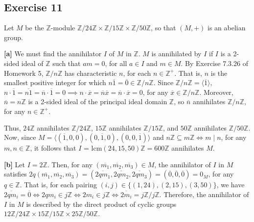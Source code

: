 \subsection*{Exercise 11}
Let $M$ be the $\mathbb{Z}$-module $\mathbb{Z}/24\mathbb{Z} \times \mathbb{Z}/15\mathbb{Z} \times \mathbb{Z}/50\mathbb{Z}$, so that $(M,+)$ is an abelian group.

\vspace{5 mm}
\textbf{[a]} We must find the annihilator $I$ of $M$ in $\mathbb{Z}$. $M$ is annihilated by $I$ if $I$ is a 2-sided ideal of $\mathbb{Z}$ such that $am = 0$, for all $a \in I$ and $m \in M$. By Exercise 7.3.26 of Homework 5, $\mathbb{Z}
/n\mathbb{Z}$ has characteristic $n$, for each $n \in \mathbb{Z}^+$. That is, $n$ is the smallest positive integer for which $n\overline{1} = \overline{0} \in \mathbb{Z}/n\mathbb{Z}$. Since $\mathbb{Z}/n\mathbb{Z} = \langle \overline{1} \rangle$, $n\cdot\overline{1} = \overline{n1} = \overline{n}\cdot\overline{1} = 0 \implies n\cdot\overline{x} = \overline{n}\overline{x} = \overline{n}\cdot\overline{x} = 0$, for any $\overline{x} \in \mathbb{Z}/n\mathbb{Z}$. Moreover, $\overline{n} = n\mathbb{Z}$ is a 2-sided ideal of the principal ideal domain $\mathbb{Z}$, so $\overline{n}$ annihilates $\mathbb{Z}/n\mathbb{Z}$, for any $n \in \mathbb{Z}^+$.

Thus, $24\mathbb{Z}$ annihilates $\mathbb{Z}/24\mathbb{Z}$, $15\mathbb{Z}$ annihilates $\mathbb{Z}/15\mathbb{Z}$, and $50\mathbb{Z}$ annihilates $\mathbb{Z}/50\mathbb{Z}$. Now, since $M = \langle(\overline{1},0,0),(0,\overline{1},0),(0,0,\overline{1}) \rangle$ and $n\mathbb{Z} \subseteq m\mathbb{Z} \iff m \mid n$, for any $m,n \in \mathbb{Z}$, it follows that $I$ = lcm$(24,15,50)\mathbb{Z} = 600\mathbb{Z}$ annihilates $M$.

\vspace{5 mm}
\textbf{[b]} Let $I = 2\mathbb{Z}$. Then, for any $(\overline{m_1}, \overline{m_2}, \overline{m_3}) \in M$, the annihilator of $I$ in $M$ satisfies $2q(\overline{m_1}, \overline{m_2}, \overline{m_3}) = (\overline{2qm_1}, \overline{2qm_2}, \overline{2qm_3}) = (\overline{0}, \overline{0}, \overline{0}) = 0_M$, for any $q \in \mathbb{Z}$. That is, for each pairing $(i,j) \in \{(1,24),(2,15),(3,50)\}$, we have $\overline{2qm_i} = \overline{0} \iff 2qm_i \in j\mathbb{Z} \iff 2m_i \in j\mathbb{Z} \iff \overline{2m_i} = j\mathbb{Z}/j\mathbb{Z}$. Therefore, the annihilator of $I$ in $M$ is described by the direct product of cyclic groups $12\mathbb{Z}/24\mathbb{Z} \times 15\mathbb{Z}/15\mathbb{Z} \times 25\mathbb{Z}/50\mathbb{Z}$.